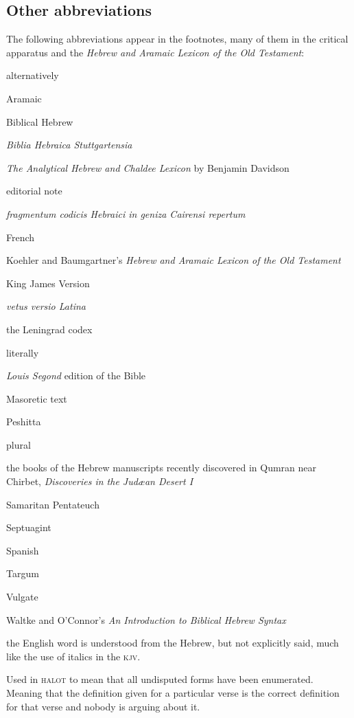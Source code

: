 \subsection{Other abbreviations}
The following abbreviations appear in the footnotes, many of them in the critical apparatus and the \textit{Hebrew and Aramaic Lexicon of the Old Testament}:
\begin{description}[labelsep=3em, font=\normalfont, itemsep=-0.25em]
    \item[\textsc{alt}] alternatively
    \item[Aram.] Aramaic
    \item[\textsc{bh}] Biblical Hebrew
    \item[\textsc{bhs}] \textit{Biblia Hebraica Stuttgartensia}
    \item[Davidson] \textit{The Analytical Hebrew and Chaldee Lexicon} by Benjamin Davidson
    \item[\textsc{ed}] editorial note
    \item[\fragheb] \textit{fragmentum codicis Hebraici in geniza Cairensi repertum}
    \item[Fr.] French
    \item[\textsc{halot}] Koehler and Baumgartner's \textit{Hebrew and Aramaic Lexicon of the Old Testament}
    \item[\textsc{kjv}] King James Version
    \item[\latina] \textit{vetus versio Latina}
    \item[L] the Leningrad codex
    \item[\textsc{lit}] literally
    \item[\textsc{lsg}] \textit{Louis Segond} edition of the Bible
    \item[\masoretic] Masoretic text
    \item[\peshitta] Peshitta
    \item[pl.] plural
    \item[\qumran] the books of the Hebrew manuscripts recently discovered in Qumran near Chirbet, \textit{Discoveries in the Jud\ae an Desert I}
    \item[\sampen] Samaritan Pentateuch
    \item[\septuagint] Septuagint
    \item[Sp.] Spanish
    \item[\targum] Targum
    \item[\vulgate] Vulgate
    \item [W\&O] Waltke and O'Connor's \textit{An Introduction to Biblical Hebrew Syntax}
    \item[\textdegree\dots$\mathscr{U}$] the English word is understood from the Hebrew, but not explicitly said, much like the use of italics in the \textsc{kjv}.
    \item[\hadagger] Used in \textsc{halot} to mean that all undisputed forms have been enumerated. Meaning that the definition given for a particular verse is the correct definition for that verse and nobody is arguing about it.
\end{description}

